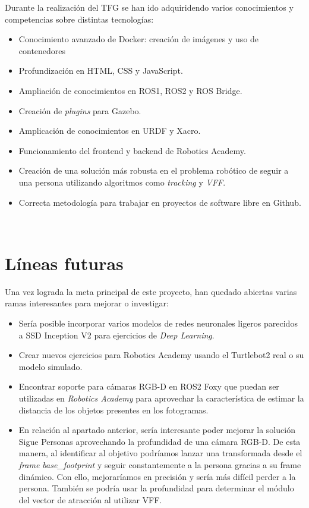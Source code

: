 Durante la realización del TFG se han ido adquiridendo varios conocimientos y competencias sobre distintas tecnologías:

\begin{itemize}
	\item Conocimiento avanzado de Docker: creación de imágenes y uso de contenedores
	\item Profundización en HTML, CSS y JavaScript.
	\item Ampliación de conocimientos en ROS1, ROS2 y ROS Bridge.
	\item Creación de \textit{plugins} para Gazebo.
	\item Amplicación de conocimientos en URDF y Xacro.
	\item Funcionamiento del frontend y backend de Robotics Academy.
	\item Creación de una solución más robusta en el problema robótico de seguir a una persona utilizando algoritmos como \textit{tracking} y \textit{VFF}.
	\item Correcta metodología para trabajar en proyectos de software libre en Github.
\end{itemize}\

\section{Líneas futuras}
\label{sec:lineas_futuras}

Una vez lograda la meta principal de este proyecto, han quedado abiertas varias ramas interesantes para mejorar o investigar:

\begin{itemize}
	\item Sería posible incorporar varios modelos de redes neuronales ligeros parecidos a SSD Inception V2 para ejercicios de \textit{Deep Learning}.
	\item Crear nuevos ejercicios para Robotics Academy usando el Turtlebot2 real o su modelo simulado.
	\item Encontrar soporte para cámaras RGB-D en ROS2 Foxy que puedan ser utilizadas en \textit{Robotics Academy} para aprovechar la característica de estimar la distancia de los objetos presentes en los fotogramas.
	\item En relación al apartado anterior, sería interesante poder mejorar la solución Sigue Personas aprovechando la profundidad de una cámara RGB-D. De esta manera, al identificar al objetivo podríamos lanzar una transformada desde el \textit{frame base\_footprint} y seguir constantemente a la persona gracias a su frame dinámico. Con ello, mejoraríamos en precisión y sería más difícil perder a la persona. También se podría usar la profundidad para determinar el módulo del vector de atracción al utilizar VFF.
\end{itemize}

